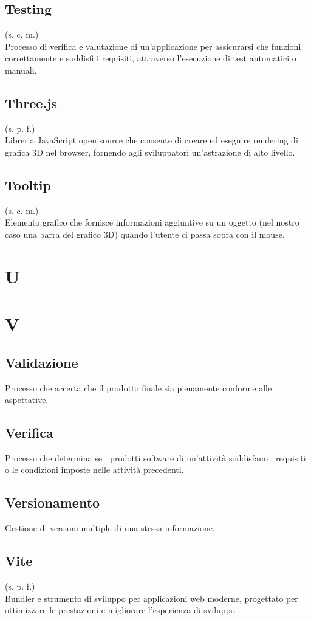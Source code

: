\subsection{Testing}
\label{Testing}
(s. c. m.)\\
Processo di verifica e valutazione di un'applicazione per assicurarsi che funzioni correttamente e
soddisfi i requisiti, attraverso l'esecuzione di test automatici o manuali.
\subsection{Three.js}
(s. p. f.)\\
Libreria JavaScript open source che consente di creare ed eseguire rendering
di grafica 3D nel browser, fornendo agli sviluppatori un'astrazione di alto livello.
\subsection{Tooltip}
(s. c. m.)\\
Elemento grafico che fornisce informazioni aggiuntive su un oggetto 
(nel nostro caso una barra del grafico 3D) quando l'utente ci passa sopra con il mouse. 
\pagebreak
\section{U}
\pagebreak
\section{V}
\subsection{Validazione}
Processo che accerta che il prodotto finale sia pienamente conforme alle
aspettative.
\subsection{Verifica}
Processo che determina se i prodotti software di un'attività soddisfano i
requisiti o le condizioni imposte nelle attività precedenti.
\subsection{Versionamento}
Gestione di versioni multiple di una stessa informazione.
\subsection{Vite}
(s. p. f.)\\
Bundler e strumento di sviluppo per applicazioni web moderne, progettato per
ottimizzare le prestazioni e migliorare l'esperienza di sviluppo.
\pagebreak

